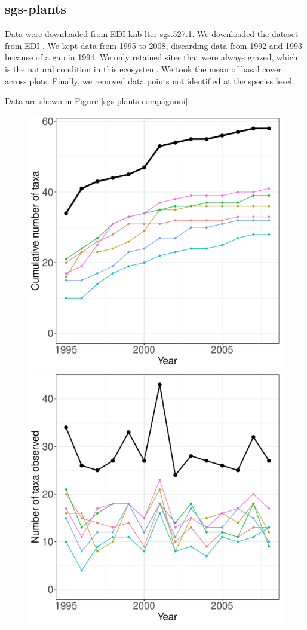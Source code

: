 \documentclass[11pt, oneside]{article}
\begin{document}
\subsection{sgs-plants}
Data were downloaded from EDI {knb-lter-sgs.527.1}.
We downloaded the dataset from EDI \citep{Milchunas2014}. 
We kept data from 1995 to 2008, discarding data from 1992 and 1993 because of a gap in 1994. 
We only retained sites that were always grazed, which is the natural condition in this ecosystem. 
We took the mean of basal cover across plots. Finally, we removed data points not identified at the species level.

Data are shown in Figure \ref{sgs-plants-compagnoni}.
\begin{figure}[h!]
\centering
\includegraphics[scale = 0.4]{sgs-plants-compagnoni_species_accumulation_curve.pdf}
\includegraphics[scale = 0.4]{sgs-plants-compagnoni_num_taxa_over_time.pdf}

\end{figure}
\end{document}
